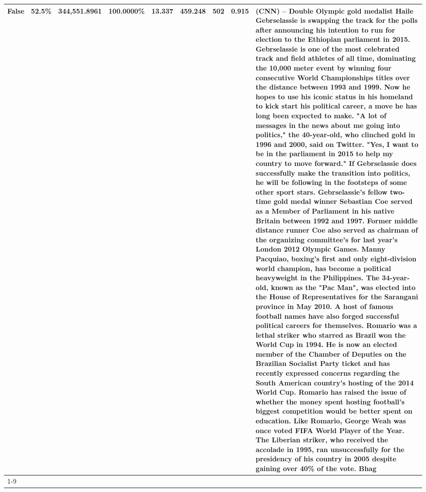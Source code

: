 \begin{table}[H]
{\begin{tabular}{lllrlllll}
False & 52.5\% & 344,551.8961 & \bfseries \color{red} 100.0000\% & 13.337 & 459.248 & 502 & 0.915 & (CNN) -- Double Olympic gold medalist Haile Gebrselassie is swapping the track for the polls after announcing his intention to run for election to the Ethiopian parliament in 2015. Gebrselassie is one of the most celebrated track and field athletes of all time, dominating the 10,000 meter event by winning four consecutive World Championships titles over the distance between 1993 and 1999. Now he hopes to use his iconic status in his homeland to kick start his political career, a move he has long been expected to make. "A lot of messages in the news about me going into politics," the 40-year-old, who clinched gold in 1996 and 2000, said on Twitter. "Yes, I want to be in the parliament in 2015 to help my country to move forward." If Gebrselassie does successfully make the transition into politics, he will be following in the footsteps of some other sport stars. Gebrselassie's fellow two-time gold medal winner Sebastian Coe served as a Member of Parliament in his native Britain between 1992 and 1997. Former middle distance runner Coe also served as chairman of the organizing committee's for last year's London 2012 Olympic Games. Manny Pacquiao, boxing's first and only eight-division world champion, has become a political heavyweight in the Philippines. The 34-year-old, known as the "Pac Man", was elected into the House of Representatives for the Sarangani province in May 2010. A host of famous football names have also forged successful political careers for themselves. Romario was a lethal striker who starred as Brazil won the World Cup in 1994. He is now an elected member of the Chamber of Deputies on the Brazilian Socialist Party ticket and has recently expressed concerns regarding the South American country's hosting of the 2014 World Cup. Romario has raised the issue of whether the money spent hosting football's biggest competition would be better spent on education. Like Romario, George Weah was once voted FIFA World Player of the Year. The Liberian striker, who received the accolade in 1995, ran unsuccessfully for the presidency of his country in 2005 despite gaining over 40\% of the vote. Bhag \\
\cline{1-9}

\end{tabular}}
\end{table}
